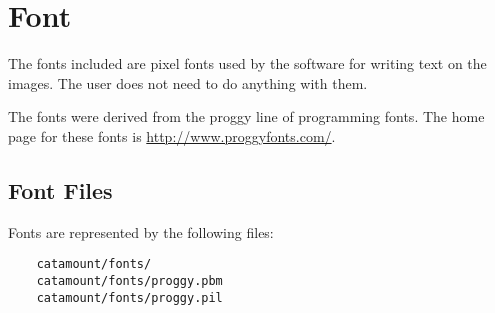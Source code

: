 \chapter{Font}
\hypertarget{font}{}

The fonts included are pixel fonts used by the software for writing
text on the images. The user does not need to do anything with them.

The fonts were derived from the proggy line of programming fonts. The
home page for these fonts is \url{http://www.proggyfonts.com/}.

\section{Font Files}

Fonts are represented by the following files:

\begin{verbatim}
    catamount/fonts/
    catamount/fonts/proggy.pbm
    catamount/fonts/proggy.pil
\end{verbatim}

